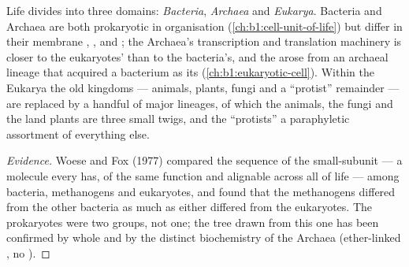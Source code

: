\begin{proposition}\label{prop:b1:classifying-biodiversity:domains}
Life divides into three domains: \emph{Bacteria}, \emph{Archaea} and
\emph{Eukarya}. Bacteria and Archaea are both prokaryotic in 
organisation (\cref{ch:b1:cell-unit-of-life}) but differ in their
membrane , ,  and ; the
Archaea's transcription and translation machinery is closer to the
eukaryotes' than to the bacteria's, and the  arose
from an archaeal lineage that acquired a bacterium as its
 (\cref{ch:b1:eukaryotic-cell}). Within the Eukarya the
old kingdoms --- animals, plants, fungi and a ``protist'' remainder ---
are replaced by a handful of major lineages, of which the animals,
the fungi and the land plants are three small twigs, and the
``protists'' a paraphyletic assortment of everything else.
\end{proposition}
\begin{proof}[Evidence]
Woese and Fox (1977) compared the sequence of the small-subunit
 --- a molecule every  has, of the same function and
alignable across all of life --- among bacteria, methanogens and
eukaryotes, and found that the methanogens differed from the other
bacteria as much as either differed from the eukaryotes. The
prokaryotes were two groups, not one; the tree drawn from this one
 has been confirmed by whole  and by the distinct
biochemistry of the Archaea (ether-linked , no ).
\end{proof}

